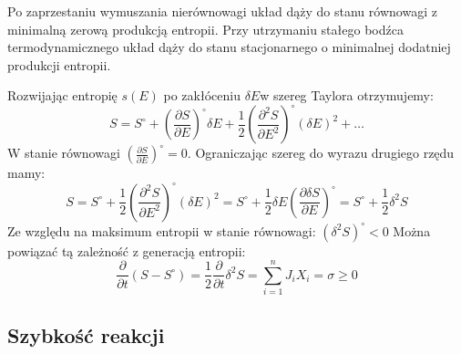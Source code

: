 \documentclass[10pt, a4paper, twoside, onecolumn]{article}
\numberwithin{equation}{section}
\begin{document}
	
	Po zaprzestaniu wymuszania nierównowagi układ dąży do stanu równowagi z minimalną zerową produkcją entropii. Przy utrzymaniu stałego bodźca termodynamicznego układ dąży do stanu stacjonarnego o minimalnej dodatniej produkcji entropii. \par
	Rozwijając entropię \(s\left(E\right)\) po zakłóceniu \(\delta E\)w szereg Taylora otrzymujemy:
	\begin{equation}
		S=S^\circ+\left(\frac{\partial S}{\partial E}\right)^\circ \delta E+\frac{1}{2}\left(\frac{\partial^{2}S}{\partial E^{2}}\right)^\circ \left(\delta E\right)^2 + \ldots
	\end{equation}
	W stanie równowagi \(\left(\frac{\partial S}{\partial E}\right)^\circ=0\). Ograniczając szereg do wyrazu drugiego rzędu mamy:
	\begin{equation}
		S=S^\circ+\frac{1}{2}\left(\frac{\partial^{2}S}{\partial E^{2}}\right)^\circ \left(\delta E\right)^2=S^\circ+\frac{1}{2} \delta E\left(\frac{\partial \delta S}{\partial E}\right)^\circ=S^\circ+\frac{1}{2}\delta^{2}S
	\end{equation}
	Ze względu na maksimum entropii w stanie równowagi: \(\left(\delta^2 S\right)^\circ<0\)
	Można powiązać tą zależność z generacją entropii: 
	\begin{equation}
		\frac{\partial}{\partial t}\left(S-S^\circ\right)=\frac{1}{2}\frac{\partial}{\partial t}\delta^2 S=\sum_{i=1}^{n}J_{i}X_{i}=\sigma\geq0
	\end{equation}
	\subsection{Szybkość reakcji}
	
\end{document}
